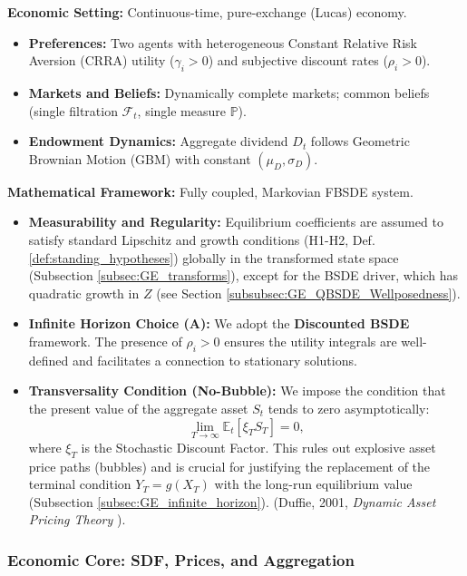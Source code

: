 \begin{tcolorbox}[colback=blue!5!white, colframe=blue!75!black, title={Assumptions \& Scope (Two-Agent GE FBSDE)}]
\textbf{Economic Setting:} Continuous-time, pure-exchange (Lucas) economy.
\begin{itemize}[leftmargin=1.2em, itemsep=2pt]
    \item \textbf{Preferences:} Two agents with heterogeneous Constant Relative Risk Aversion (CRRA) utility ($\gamma_i>0$) and subjective discount rates ($\rho_i>0$).
    \item \textbf{Markets and Beliefs:} Dynamically complete markets; common beliefs (single filtration $\mathcal{F}_t$, single measure $\mathbb{P}$).
    \item \textbf{Endowment Dynamics:} Aggregate dividend $D_t$ follows Geometric Brownian Motion (GBM) with constant $(\mu_D, \sigma_D)$.
\end{itemize}
\textbf{Mathematical Framework:} Fully coupled, Markovian FBSDE system.
\begin{itemize}[leftmargin=1.2em, itemsep=2pt]
    \item \textbf{Measurability and Regularity:} Equilibrium coefficients are assumed to satisfy standard Lipschitz and growth conditions (H1-H2, Def. \ref{def:standing_hypotheses}) globally in the transformed state space (Subsection \ref{subsec:GE_transforms}), except for the BSDE driver, which has quadratic growth in $Z$ (see Section \ref{subsubsec:GE_QBSDE_Wellposedness}).
    \item \textbf{Infinite Horizon Choice (A):} We adopt the \textbf{Discounted BSDE} framework. The presence of $\rho_i>0$ ensures the utility integrals are well-defined and facilitates a connection to stationary solutions.
    \item \textbf{Transversality Condition (No-Bubble):} We impose the condition that the present value of the aggregate asset $S_t$ tends to zero asymptotically:
    \[
        \lim_{T\to\infty} \mathbb{E}_t\left[ \xi_T S_T \right] = 0,
    \]
    where $\xi_T$ is the Stochastic Discount Factor. This rules out explosive asset price paths (bubbles) and is crucial for justifying the replacement of the terminal condition $Y_T=g(X_T)$ with the long-run equilibrium value (Subsection \ref{subsec:GE_infinite_horizon}). (Duffie, 2001, \emph{Dynamic Asset Pricing Theory} \cite{Duffie2001}).
\end{itemize}
\end{tcolorbox}

\subsubsection{Economic Core: SDF, Prices, and Aggregation}

